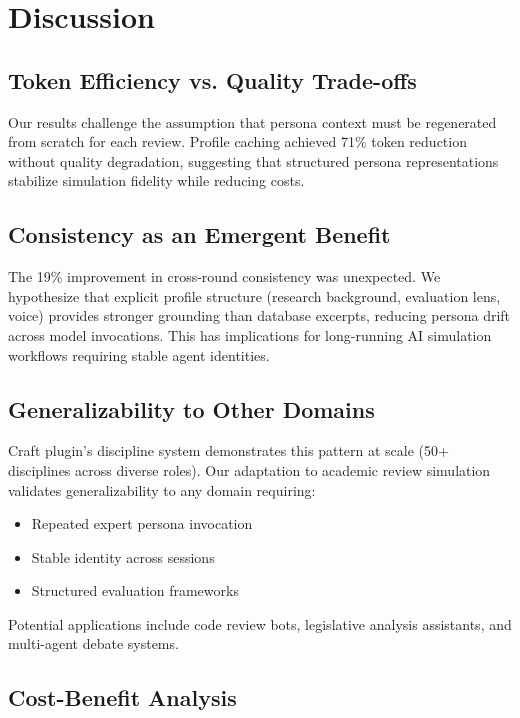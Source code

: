 \section{Discussion}

\subsection{Token Efficiency vs. Quality Trade-offs}

Our results challenge the assumption that persona context must be regenerated from scratch for each review. Profile caching achieved 71\% token reduction without quality degradation, suggesting that structured persona representations stabilize simulation fidelity while reducing costs.

\subsection{Consistency as an Emergent Benefit}

The 19\% improvement in cross-round consistency was unexpected. We hypothesize that explicit profile structure (research background, evaluation lens, voice) provides stronger grounding than database excerpts, reducing persona drift across model invocations. This has implications for long-running AI simulation workflows requiring stable agent identities.

\subsection{Generalizability to Other Domains}

Craft plugin's discipline system demonstrates this pattern at scale (50+ disciplines across diverse roles). Our adaptation to academic review simulation validates generalizability to any domain requiring:

\begin{itemize}
\item Repeated expert persona invocation
\item Stable identity across sessions
\item Structured evaluation frameworks
\end{itemize}

Potential applications include code review bots, legislative analysis assistants, and multi-agent debate systems.

\subsection{Cost-Benefit Analysis}


